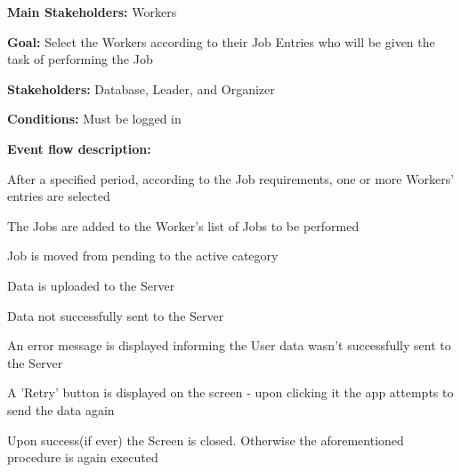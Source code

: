 			\noindent {}
			\begin{packed_item}
				\item \textbf{Main Stakeholders:} Workers
				\item \textbf{Goal:} Select the Workers according to their Job Entries who will be given the task of performing the Job
				\item \textbf{Stakeholders: } Database, Leader, and Organizer
				\item \textbf{Conditions: } Must be logged in
				\item \textbf{Event flow description: }
				\begin{packed_enum}
					\item After a specified period, according to the Job requirements, one or more Workers' entries are selected
					\item The Jobs are added to the Worker's list of Jobs to be performed
					\item Job is moved from pending to the active category
					\item Data is uploaded to the Server
				\end{packed_enum}
				
				\begin{packed_item}
					\item[3.a] Data not successfully sent to the Server
					\item[] \begin{packed_enum}
						\item An error message is displayed informing the User data wasn't successfully sent to the Server
						\item A 'Retry' button is displayed on the screen - upon clicking it the app attempts to send the data again
						\item Upon success(if ever) the Screen is closed. Otherwise the aforementioned procedure is again executed
					\end{packed_enum}
				\end{packed_item}
			\end{packed_item}
		
